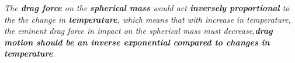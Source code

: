 
\textit{The \textbf{drag force} on the \textbf{spherical mass} would act \textbf{inversely proportional} to the the change in \textbf{temperature}, which means that with increase in temperature, the eminent drag force in impact on the spherical mass must decrease,\textbf{drag motion should be an inverse exponential compared to changes in temperature}.}


